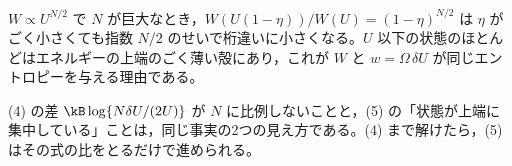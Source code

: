 \item $W\propto U^{N/2}$ で $N$ が巨大なとき，$W(U(1-\eta))/W(U)=(1-\eta)^{N/2}$ は $\eta$ がごく小さくても指数 $N/2$ のせいで桁違いに小さくなる。$U$ 以下の状態のほとんどはエネルギーの上端のごく薄い殻にあり，これが $W$ と $w=\Omega\,\delta U$ が同じエントロピーを与える理由である。
\item (4) の差 $\kB\log\{N\delta U/(2U)\}$ が $N$ に比例しないことと，(5) の「状態が上端に集中している」ことは，同じ事実の2つの見え方である。(4) まで解けたら，(5) はその式の比をとるだけで進められる。
